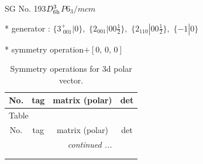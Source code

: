 \documentclass[fleqn,8pt]{jsarticle}
\begin{document}
\setcounter{MaxMatrixCols}{32}

\renewcommand{\tablename}{Table~}
\renewcommand{\figurename}{Figure~}
\begin{center}
\LARGE
SG No. 193\quad$D_{\rm 6h}^{3}$\quad$P6_3/mcm$\quad[ hexagonal ]
\end{center}

* generator : $\{3^{+}_{\,\,001}|0\},\,\,\{2{}_{001}|0 0 \frac{1}{2}\},\,\,\{2{}_{110}|0 0 \frac{1}{2}\},\,\,\{-1|0\}$

* symmetry operation\quad$+\left[ 0,\, 0,\, 0 \right]$
\renewcommand{\arraystretch}{1.3}
\begin{longtable}{cccc}
\caption{Symmetry operations for 3d polar vector.}
 \\
 \hline \hline
No. & tag & matrix (polar) & det \\ \hline \endfirsthead

\multicolumn{3}{l}{\tablename\ \thetable{}} \\
 \hline \hline
No. & tag & matrix (polar) & det \\ \hline \endhead

 \hline \hline
\multicolumn{3}{r}{\footnotesize\it continued ...} \\ \endfoot

 \hline \hline
\multicolumn{3}{r}{} \\ \endlastfoot


\end{longtable}
\end{document}
